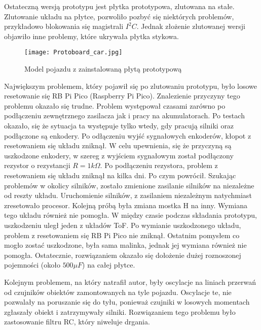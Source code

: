         Ostateczną wersją prototypu jest płytka prototypowa, zlutowana na stałe.
        Zlutowanie układu na płytce, pozwoliło pozbyć się niektórych problemów, przykładowo blokowania się magistrali $I^2C$.
        Jednak złożenie zlutowanej wersji objawiło inne problemy, które ukrywała płytka stykowa.
        \begin{figure}[!ht]
            \centering
            \texttt{[image: Protoboard\_car.jpg]}
            \caption{Model pojazdu z zainstalowaną płytą prototypową}
            \label{fig:protoboard_car}
        \end{figure}

        Największym problemem, który pojawił się po zlutowaniu prototypu, było losowe resetowanie się RB Pi Pico (Raspberry Pi Pico).
        Znalezienie przyczyny tego problemu okazało się trudne.
        Problem występował czasami zarówno po podłączeniu zewnętrznego zasilacza jak i pracy na akumulatorach.
        Po testach okazało, się że sytuacja ta występuje tylko wtedy, gdy pracują silniki oraz podłączone są enkodery.
        Po odłączeniu wyjść sygnałowych enkoderów, kłopot z resetowaniem się układu zniknął.
        W celu upewnienia, się że przyczyną są uszkodzone enkodery, w szereg z wyjściem sygnałowym został podłączony rezystor o rezystancji $R =1k\Omega$.
        Po podłączeniu rezystora, problem z resetowaniem się układu zniknął na kilka dni.
        Po czym powrócił. Szukając problemów w okolicy silników, zostało zmienione zasilanie silników na niezależne od reszty układu.
        Uruchomienie silników, z zasilaniem niezależnym natychmiast zresetowało procesor.
        Kolejną próbą była zmiana mostka H na inny. Wymiana tego układu również nie pomogła.
        W między czasie podczas składania prototypu, uszkodzeniu uległ jeden z układów ToF.
        Po wymianie uszkodzonego układu, problem z resetowaniem się RB Pi Pico nie zniknął.
        Ostatnim pomysłem co mogło zostać uszkodzone, była sama malinka, jednak jej wymiana również nie pomogła.
        Ostatecznie, rozwiązaniem okazało się dołożenie dużej roznoszonej pojemności (około $500\mu F$) na całej płytce.

        Kolejnym problemem, na który natrafił autor, były oscylacje na liniach przerwań od czujników obiektów zamontowanych na tyle pojazdu.
        Oscylacje te, nie pozwalały na poruszanie się do tyłu, ponieważ czujniki w losowych momentach zgłaszały obiekt i zatrzymywały silniki.
        Rozwiązaniem tego problemu było zastosowanie filtru RC, który niweluje drgania.



